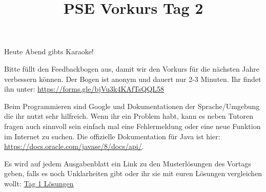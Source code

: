 \documentclass{../../sheet}
\title{PSE Vorkurs Tag 2}
\begin{document}
\maketitle
Heute Abend gibts Karaoke!

Bitte füllt den Feedbackbogen aus, damit wir den Vorkurs für die nächsten Jahre verbessern können. Der Bogen ist anonym und dauert nur 2-3 Minuten. \newline Ihr findet ihn unter: \url{https://forms.gle/bjVu3k4KAfTsQQL58}


Beim Programmieren sind Google und Dokumentationen der Sprache/Umgebung die ihr nutzt sehr hilfreich. Wenn ihr ein Problem habt, kann es neben Tutoren fragen auch sinnvoll sein einfach mal eine Fehlermeldung oder eine neue Funktion im Internet zu suchen. Die offizielle Dokumentation für Java ist hier: \url{https://docs.oracle.com/javase/8/docs/api/}.

Es wird auf jedem Ausgabenblatt ein Link zu den Musterlösungen des Vortags geben, falls es noch Unklarheiten gibt oder ihr sie mit euren Lösungen vergleichen wollt: \href{https://fius.de/wp-content/uploads/2025/10/Day1Musterloesung.zip}{Tag 1 Lösungen}
\end{document}
